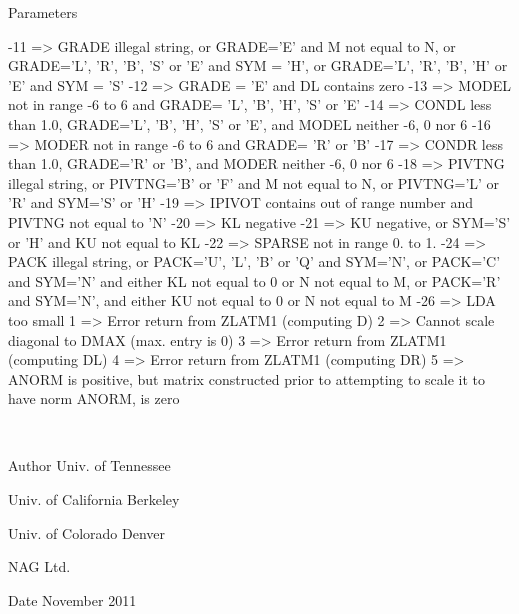 \begin{DoxyParams}[1]{Parameters}
\begin{DoxyVerb}
           -11 => GRADE illegal string, or GRADE='E' and
                  M not equal to N, or GRADE='L', 'R', 'B', 'S' or 'E'
                  and SYM = 'H', or GRADE='L', 'R', 'B', 'H' or 'E'
                  and SYM = 'S'
           -12 => GRADE = 'E' and DL contains zero
           -13 => MODEL not in range -6 to 6 and GRADE= 'L', 'B', 'H',
                  'S' or 'E'
           -14 => CONDL less than 1.0, GRADE='L', 'B', 'H', 'S' or 'E',
                  and MODEL neither -6, 0 nor 6
           -16 => MODER not in range -6 to 6 and GRADE= 'R' or 'B'
           -17 => CONDR less than 1.0, GRADE='R' or 'B', and
                  MODER neither -6, 0 nor 6
           -18 => PIVTNG illegal string, or PIVTNG='B' or 'F' and
                  M not equal to N, or PIVTNG='L' or 'R' and SYM='S'
                  or 'H'
           -19 => IPIVOT contains out of range number and
                  PIVTNG not equal to 'N'
           -20 => KL negative
           -21 => KU negative, or SYM='S' or 'H' and KU not equal to KL
           -22 => SPARSE not in range 0. to 1.
           -24 => PACK illegal string, or PACK='U', 'L', 'B' or 'Q'
                  and SYM='N', or PACK='C' and SYM='N' and either KL
                  not equal to 0 or N not equal to M, or PACK='R' and
                  SYM='N', and either KU not equal to 0 or N not equal
                  to M
           -26 => LDA too small
             1 => Error return from ZLATM1 (computing D)
             2 => Cannot scale diagonal to DMAX (max. entry is 0)
             3 => Error return from ZLATM1 (computing DL)
             4 => Error return from ZLATM1 (computing DR)
             5 => ANORM is positive, but matrix constructed prior to
                  attempting to scale it to have norm ANORM, is zero\end{DoxyVerb}
 \\
\hline
\end{DoxyParams}
\begin{DoxyAuthor}{Author}
Univ. of Tennessee 

Univ. of California Berkeley 

Univ. of Colorado Denver 

N\+A\+G Ltd. 
\end{DoxyAuthor}
\begin{DoxyDate}{Date}
November 2011 
\end{DoxyDate}
\hypertarget{group__complex16__matgen_ga0c0eb38dc5f769378bf4d4ec4918d857}{}
